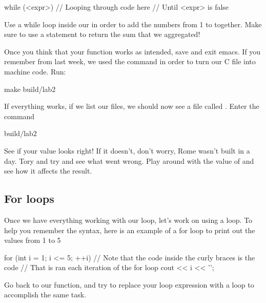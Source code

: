 \documentclass{tufte-handout}
\begin{document}
\begin{Code}
    while (<expr>) {
        // Looping through code here
        // Until <expr> is false
    }
\end{Code}


Use a while loop inside our  in order to add the numbers from 1 to  together.
Make sure to use a  statement to return the sum that we aggregated!

Once you think that your function works as intended, save and exit emacs. If you remember from last week, we used the  command in order to turn our C file into machine code. Run:
\begin{CmdLine}
  \prompt make build/lab2
\end{CmdLine}
If everything works, if we list our files, we should now see a file called .  Enter the command
\begin{CmdLine}
  \prompt build/lab2
\end{CmdLine}
See if your value looks right!  If it doesn't, don't worry, Rome wasn't built in a day.  Tory and try and see what went wrong.  Play around with the value of  and see how it affects the result.

\subsection{For loops}


Once we have everything working with our  loop, let's work on using a  loop.  To help you remember the syntax, here is an example of a for loop to print out the values from 1 to 5

\begin{Code}
    for (int i = 1; i <= 5; ++i) {
        // Note that the code inside the curly braces is the code
        // That is ran each iteration of the for loop
        cout << i << '\n';
    }
\end{Code}

Go back to our  function, and try to replace your  loop expression with a  loop to accomplish the same task.
\end{document}
